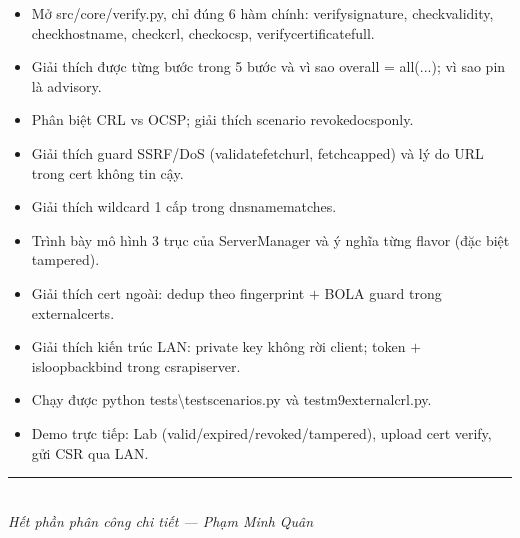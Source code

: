 \documentclass[12pt,a4paper]{article}
\newcommand{\code}[1]{{\ttfamily\small\def\_{\textunderscore\discretionary{}{}{}}#1}}
\begin{document}
\begin{itemize}
  \item[\textbf{$\square$}] Mở \code{src/core/verify.py}, chỉ đúng 6 hàm chính:
        \code{verify\_signature}, \code{check\_validity}, \code{check\_hostname},
        \code{check\_crl}, \code{check\_ocsp}, \code{verify\_certificate\_full}.
  \item[\textbf{$\square$}] Giải thích được từng bước trong 5 bước và vì sao
        \code{overall = all(...)}; vì sao pin là advisory.
  \item[\textbf{$\square$}] Phân biệt CRL vs OCSP; giải thích scenario
        \code{revoked\_ocsp\_only}.
  \item[\textbf{$\square$}] Giải thích guard SSRF/DoS (\code{\_validate\_fetch\_url},
        \code{\_fetch\_capped}) và lý do URL trong cert không tin cậy.
  \item[\textbf{$\square$}] Giải thích wildcard 1 cấp trong \code{\_dnsname\_matches}.
  \item[\textbf{$\square$}] Trình bày mô hình 3 trục của \code{ServerManager} và
        ý nghĩa từng flavor (đặc biệt \code{tampered}).
  \item[\textbf{$\square$}] Giải thích cert ngoài: dedup theo fingerprint $+$ BOLA
        guard trong \code{external\_certs}.
  \item[\textbf{$\square$}] Giải thích kiến trúc LAN: private key không rời client;
        token $+$ \code{\_is\_loopback\_bind} trong \code{csr\_api\_server}.
  \item[\textbf{$\square$}] Chạy được \code{python tests\textbackslash test\_scenarios.py}
        và \code{test\_m9\_external\_crl.py}.
  \item[\textbf{$\square$}] Demo trực tiếp: Lab (valid/expired/revoked/tampered),
        upload cert verify, gửi CSR qua LAN.
\end{itemize}

\vspace{0.6cm}
\begin{center}
{\color{accent}\rule{0.5\linewidth}{0.8pt}}\\[0.3cm]
{\small\itshape Hết phần phân công chi tiết — Phạm Minh Quân}
\end{center}
\end{document}

